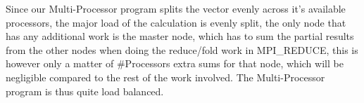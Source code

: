 Since our Multi-Processor program splits the vector evenly across it's available processors,
the major load of the calculation is evenly split, the only node that has any additional work is the master node, which has to sum the partial results from the other nodes when doing the reduce/fold work in MPI\_REDUCE, this is however only a matter of #Processors extra sums for that node, which will be negligible compared to the rest of the work involved. The Multi-Processor program is thus quite load balanced.
